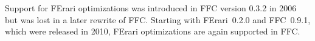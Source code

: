 Support for FErari optimizations was introduced in FFC version 0.3.2
in 2006 but was lost in a later rewrite of FFC. Starting with
FErari~0.2.0 and FFC~0.9.1, which were released in 2010, FErari
optimizations are again supported in FFC.

\processqueries

\endgroup


